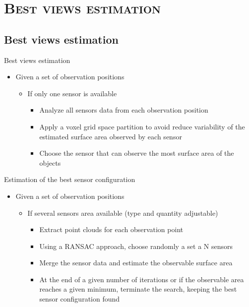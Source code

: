 \section{\scshape Best views estimation}
\subsection*{Best views estimation}
\begin{frame}{Best views estimation}
	\begin{itemize}
		\item Given a set of observation positions
		\begin{itemize}
			\item If only one sensor is available
			\begin{itemize}
				\item Analyze all sensors data from each observation position
				\item Apply a voxel grid space partition to avoid reduce variability of the estimated surface area observed by each sensor
				\item Choose the sensor that can observe the most surface area of the objects
			\end{itemize}
		\end{itemize}
	\end{itemize}
\end{frame}


\begin{frame}{Estimation of the best sensor configuration}
	\begin{itemize}
		\item Given a set of observation positions
		\begin{itemize}
			\item If several sensors area available (type and quantity adjustable)
			\begin{itemize}
				\item Extract point clouds for each observation point
				\item Using a RANSAC approach, choose randomly a set a N sensors
				\item Merge the sensor data and estimate the observable surface area
				\item At the end of a given number of iterations or if the observable area reaches a given minimum, terminate the search, keeping the best sensor configuration found
			\end{itemize}
		\end{itemize}
	\end{itemize}
\end{frame}
